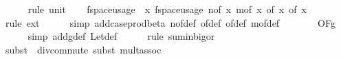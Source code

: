 \begin{isabellebody}
\ \ \ \ \isamarkupfalse%
\ {\isacharparenleft}{\kern0pt}rule\ unit{\isacharunderscore}{\kern0pt}{}{\isacharparenright}{\kern0pt}\isanewline
\isanewline
\ \ \isamarkupfalse%
\ {\isachardoublequoteopen}f{}{\isacharunderscore}{\kern0pt}space{\isacharunderscore}{\kern0pt}usage\ {\isacharequal}{\kern0pt}\ {\isacharparenleft}{\kern0pt}{\isasymlambda}x{\isachardot}{\kern0pt}\ f{}{\isacharunderscore}{\kern0pt}space{\isacharunderscore}{\kern0pt}usage\ {\isacharparenleft}{\kern0pt}n{\isacharunderscore}{\kern0pt}of\ x{\isacharcomma}{\kern0pt}\ m{\isacharunderscore}{\kern0pt}of\ x{\isacharcomma}{\kern0pt}\ {\isasymepsilon}{\isacharunderscore}{\kern0pt}of\ x{\isacharcomma}{\kern0pt}\ {\isasymdelta}{\isacharunderscore}{\kern0pt}of\ x{\isacharparenright}{\kern0pt}{\isacharparenright}{\kern0pt}{\isachardoublequoteclose}\isanewline
\ \ \ \ \isamarkupfalse%
\ {\isacharparenleft}{\kern0pt}rule\ ext{\isacharparenright}{\kern0pt}\isanewline
\ \ \ \ \isamarkupfalse%
\ {\isacharparenleft}{\kern0pt}simp\ add{\isacharcolon}{\kern0pt}case{\isacharunderscore}{\kern0pt}prod{\isacharunderscore}{\kern0pt}beta{\isacharprime}{\kern0pt}\ n{\isacharunderscore}{\kern0pt}of{\isacharunderscore}{\kern0pt}def\ {\isasymepsilon}{\isacharunderscore}{\kern0pt}of{\isacharunderscore}{\kern0pt}def\ {\isasymdelta}{\isacharunderscore}{\kern0pt}of{\isacharunderscore}{\kern0pt}def\ m{\isacharunderscore}{\kern0pt}of{\isacharunderscore}{\kern0pt}def{\isacharparenright}{\kern0pt}\isanewline
\ \ \isamarkupfalse%
\ \isamarkupfalse%
\ {\isachardoublequoteopen}{\isachardot}{\kern0pt}{\isachardot}{\kern0pt}{\isachardot}{\kern0pt}\ {\isasymin}\ O{\isacharbrackleft}{\kern0pt}{\isacharquery}{\kern0pt}F{\isacharbrackright}{\kern0pt}{\isacharparenleft}{\kern0pt}g{\isacharparenright}{\kern0pt}{\isachardoublequoteclose}\isanewline
\ \ \ \ \isamarkupfalse%
\ {\isacharparenleft}{\kern0pt}simp\ add{\isacharcolon}{\kern0pt}g{\isacharunderscore}{\kern0pt}def\ Let{\isacharunderscore}{\kern0pt}def{\isacharparenright}{\kern0pt}\isanewline
\ \ \ \ \isamarkupfalse%
\ {\isacharparenleft}{\kern0pt}rule\ sum{\isacharunderscore}{\kern0pt}in{\isacharunderscore}{\kern0pt}bigo{\isacharunderscore}{\kern0pt}r{\isacharparenright}{\kern0pt}\isanewline
\ \ \ \ \ \isamarkupfalse%
\ {\isacharparenleft}{\kern0pt}subst\ {\isacharparenleft}{\kern0pt}{}{\isacharparenright}{\kern0pt}\ div{\isacharunderscore}{\kern0pt}commute{\isacharcomma}{\kern0pt}\ subst\ mult{\isachardot}{\kern0pt}assoc{\isacharparenright}{\kern0pt}\isanewline

\end{isabellebody}
